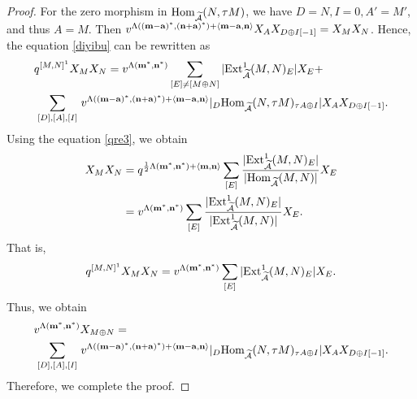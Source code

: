 \documentclass[reqno,12pt]{amsart}
\numberwithin{equation}{section}
\def\Ext{\mbox{\rm Ext}} \def\Hom{\mbox{\rm Hom}} \def\dim{\mbox{\rm dim}} \def\Iso{\mbox{\rm Iso}\,}\def\Ind{\mbox{\rm Ind}\,}
\def\lr#1{\langle #1\rangle} \def\fin{\hfill$\square$}  \def\lra{\longrightarrow} \def\mod{\mbox{\rm \textbf{mod}}\,}\def\Mod{\mbox{\rm mod}\,}\def\top{\mbox{\rm top}\,}\def\soc{\mbox{\rm soc}\,}
\theoremstyle{plain} %
\theoremstyle{definition} %
\begin{document}
\begin{proof}
For the zero morphism in $\Hom_{\widetilde{\A}}(N,\tau M)$, we have $D=N, I=0, A'=M'$, and thus $A=M$.
Then $v^{\Lambda(({\bf m}-{{\bf a}})^*,{({\bf n}+{\bf a})}^*)+\lr{{{\bf m}}-{{\bf a}},{\bf n}}}X_{A} X_{D\oplus I[-1]}=X_MX_N$.
Hence, the equation \eqref{diyibu} can be rewritten as
\begin{equation*}
\begin{split}
&q^{[M,N]^1}X_M X_N=v^{\Lambda({\bf m}^*,{\bf n}^*)}\sum\limits_{[E]\neq [M\oplus N]}
|\Ext_{\widetilde{\A}}^1(M,N)_E|X_E+\\&\sum\limits_{\begin{smallmatrix}[D],[A],[I]\end{smallmatrix}}v^{\Lambda(({\bf m}-{{\bf a}})^*,{({\bf n}+{\bf a})}^*)+\lr{{{\bf m}}-{{\bf a}},{\bf n}}}|_D\Hom_{\widetilde{\A}}(N,\tau M)_{\tau A\oplus I}|X_{A} X_{D\oplus I[-1]}.
\end{split}\end{equation*}
Using the equation \eqref{qre3}, we obtain
\begin{equation*}
\begin{split}
X_{M} X_{N}&=q^{\frac{1}{2}\Lambda({\bf m}^\ast,{\bf n}^\ast)+\lr{{\bf m},{\bf n}}}\sum_{[E]}\frac{|\mathrm{Ext}_{\widetilde{\A}}^{1}(M,N)_{E}|}{|\mathrm{Hom}_{\widetilde{\A}}(M,N)|}X_E\\
&=v^{\Lambda({\bf m}^\ast,{\bf n}^\ast)}\sum_{[E]}\frac{|\mathrm{Ext}_{\widetilde{\A}}^{1}(M,N)_{E}|}{|\mathrm{Ext}_{\widetilde{\A}}^1(M,N)|}X_E.
\end{split}
\end{equation*}
That is, \begin{equation}\label{diergx}
q^{[M,N]^1}X_M X_N=v^{\Lambda({\bf m}^*,{\bf n}^*)}\sum\limits_{[E]}
|\Ext_{\widetilde{\A}}^1(M,N)_E|X_E.\end{equation}
Thus, we obtain
\begin{equation}\label{disangx}\begin{split}
&v^{\Lambda({\bf m}^*,{\bf n}^*)}X_{M\oplus N}=\\&\sum\limits_{\begin{smallmatrix}[D],[A],[I]\end{smallmatrix}}v^{\Lambda(({\bf m}-{{\bf a}})^*,{({\bf n}+{\bf a})}^*)+\lr{{{\bf m}}-{{\bf a}},{\bf n}}}|_D\Hom_{\widetilde{\A}}(N,\tau M)_{\tau A\oplus I}|X_{A} X_{D\oplus I[-1]}.\end{split}\end{equation}
Therefore, we complete the proof.
\end{proof}
\end{document}
